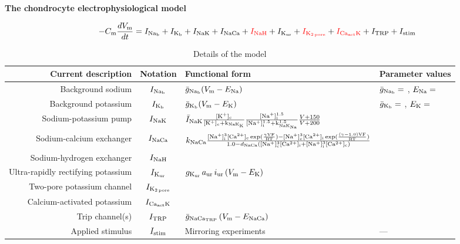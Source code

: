 \documentclass{article}
\begin{document}
\centering

{\Large \bf The chondrocyte electrophysiological model\\}

\large
\pagestyle{empty}
\begin{displaymath}
-C_{\rm m} \frac{dV_{\rm m}}{dt} = I_{\rm Na_b} + I_{\rm K_b}
                               + I_{\rm NaK} + I_{\rm NaCa}
                               + \textcolor{missing}{I_{\rm NaH}} + I_{\rm K_{ur}}
                               + \textcolor{missing}{I_{\rm K_{2\, pore}}}
                               + \textcolor{missing}{I_{\rm Ca_{act}K}}
                               + I_{\rm TRP} + I_{\rm stim}
\end{displaymath}

\begin{table}[ht]
\large
\centering
\begin{tabular}{r c l l}
\hline\hline
Current description & Notation & Functional form & Parameter values \\ [0.5ex]
\hline
Background sodium & $I_{\rm Na_b}$ & $\bar{g}_{\rm Na_b} (V_{\rm m} - E_{\rm Na})$ \cite{UNKNOWN}
                          & $\bar{g}_{\rm Na_b} = $ \cite{UNKNOWN}, $E_{\rm Na} = $ \cite{UNKNOWN}\\
Background potassium & $I_{\rm K_b}$ & $\bar{g}_{\rm K_b} (V_{\rm m} - E_{\rm K})$ \cite{UNKNOWN}
                          & $\bar{g}_{\rm K_b} = $ \cite{UNKNOWN}, $E_{\rm K} = $ \cite{UNKNOWN}\\
Sodium-potassium pump & $I_{\rm NaK}$ & $\bar{I}_{\rm NaK}
\frac{[\rm K^{+}]_{\rm c}}{[\rm K^{+}]_{\rm c} + k_{\rm NaK_{K}}}
\frac{[\rm Na^{+}]^{1.5}_{\rm i}}{[\rm Na^{+}]^{1.5}_{\rm i} + k^{1.5}_{\rm
    NaK_{Na}}}
\frac{V + 150}{V + 200}$\cite{Nygrenetal1998} & \cite{Nygrenetal1998}\\
Sodium-calcium exchanger & $I_{\rm NaCa}$ & $k_{\rm NaCa}
\frac{[\rm Na^{+}]^{3}_{i}[\rm Ca^{2+}]_{c} \exp(\frac{\gamma V F}{R T}) -
[\rm Na^{+}]^{3}_{c}[\rm Ca^{2+}]_{i} \exp(\frac{(\gamma - 1.0) V F}{R T})}
{1.0 - d_{\rm NaCa}([\rm Na^{+}]^{3}_{c}[\rm Ca^{2+}]_{i} + [\rm
  Na^{+}]^{3}_{i}[\rm Ca^{2+}]_{c})}$
\cite{Nygrenetal1998} & \cite{Nygrenetal1998}\\
Sodium-hydrogen exchanger & $I_{\rm NaH}$ & \cite{UNKNOWN} & \cite{UNKNOWN}\\
Ultra-rapidly rectifying potassium & $I_{\rm K_{ur}}$ & $g_{\rm
  K_{ur}}\, a_{\rm ur}\, i_{\rm ur}\, (V_{\rm m} - E_{\rm K})$ \cite{Maleckaretal2009} & \cite{Maleckaretal2009}\\
Two-pore potassium channel & $I_{\rm K_{2\, pore}}$ & \cite{UNKNOWN} & \cite{UNKNOWN}\\
Calcium-activated potassium & $I_{\rm Ca_{act}K}$ & \cite{UNKNOWN} & \cite{UNKNOWN}\\
Trip channel(s) & $I_{\rm TRP}$ & $\bar{g}_{\rm NaCa_{TRP}}\, (V_{\rm
  m} - E_{\rm NaCa})$ \cite{UNKNOWN} & \cite{UNKNOWN}\\
Applied stimulus & $ I_{\rm stim}$ & Mirroring experiments \cite{Clarketal2011} &  --- \\ [1ex]
\hline
\end{tabular}
\caption{Details of the model}
\label{table:chondrocyte-model-details}
\end{table}
\end{document}
